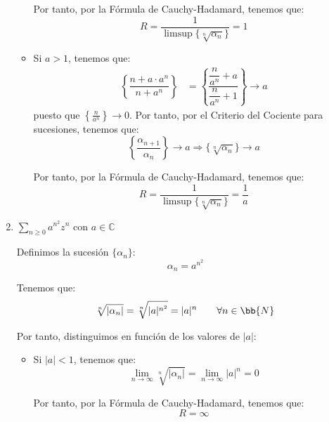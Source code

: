 \begin{ejercicio}
\begin{enumerate}
\begin{itemize}
            Por tanto, por la Fórmula de Cauchy-Hadamard, tenemos que:
            \begin{equation*}
                R = \dfrac{1}{\limsup\{\sqrt[n]{\alpha_n}\}} = 1
            \end{equation*}

            \item Si $a>1$, tenemos que:
            \begin{align*}
                \left\{\dfrac{n+a\cdot a^{n}}{n+a^n}\right\} &= \left\{\dfrac{\dfrac{n}{a^n}+a}{\dfrac{n}{a^n}+1}\right\}\to a
            \end{align*}
            puesto que $\left\{\frac{n}{a^n}\right\} \to 0$.            
            Por tanto, por el Criterio del Cociente para sucesiones, tenemos que:
            \begin{equation*}
                \left\{\dfrac{\alpha_{n+1}}{\alpha_n}\right\}\to a
                \Longrightarrow
                \{\sqrt[n]{\alpha_n}\}\to a
            \end{equation*}

            Por tanto, por la Fórmula de Cauchy-Hadamard, tenemos que:
            \begin{equation*}
                R = \dfrac{1}{\limsup\{\sqrt[n]{\alpha_n}\}} = \dfrac{1}{a}
            \end{equation*}            
        \end{itemize}
        \item $\displaystyle \sum_{n \geq 0} a^{n^2}z^n$ con $a \in \mathbb{C}$
        
        Definimos la sucesión $\{\alpha_n\}$:
        \[
            \alpha_n = a^{n^2}
        \]

        Tenemos que:
        \begin{equation*}
            \sqrt[n]{|\alpha_n|} = \sqrt[n]{|a|^{n^2}} = |a|^n\qquad \forall n\in \bb{N}
        \end{equation*}

        Por tanto, distinguimos en función de los valores de $|a|$:
        \begin{itemize}
            \item Si $|a|<1$, tenemos que:
            \begin{equation*}
                \lim_{n \to \infty} \sqrt[n]{|\alpha_n|} = \lim_{n \to \infty} |a|^n = 0
            \end{equation*}

            Por tanto, por la Fórmula de Cauchy-Hadamard, tenemos que:
            \begin{equation*}
                R = \infty
            \end{equation*}


\end{itemize}
\end{enumerate}
\end{ejercicio}

